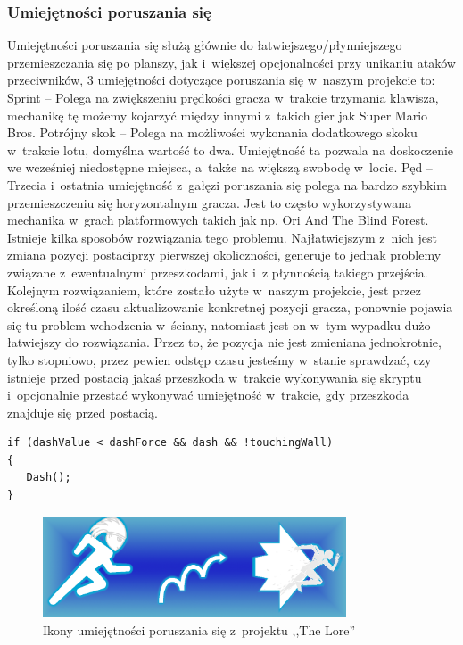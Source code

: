 \documentclass[oneside,polski,logo]{amuthesis}
\begin{document}
\subsubsection{Umiejętności poruszania się}
Umiejętności poruszania się służą głównie do łatwiejszego/płynniejszego przemieszczania się po planszy, jak i~większej opcjonalności przy unikaniu ataków przeciwników, 3 umiejętności dotyczące poruszania się w~naszym projekcie to:
Sprint – Polega na zwiększeniu prędkości gracza w~trakcie trzymania klawisza, mechanikę tę możemy kojarzyć między innymi z~takich gier jak Super Mario Bros.
Potrójny skok – Polega na możliwości wykonania dodatkowego skoku w~trakcie lotu, domyślna wartość to dwa. Umiejętność ta pozwala na doskoczenie we wcześniej niedostępne miejsca, a~także na większą swobodę w~locie.
Pęd – Trzecia i~ostatnia umiejętność z~gałęzi poruszania się polega na bardzo szybkim przemieszczeniu się horyzontalnym gracza. Jest to często wykorzystywana mechanika w~grach platformowych takich jak np. Ori And The Blind Forest. Istnieje kilka sposobów rozwiązania tego problemu. Najłatwiejszym z~nich jest zmiana pozycji postaciprzy pierwszej okoliczności, generuje to jednak problemy związane z~ewentualnymi przeszkodami, jak i~z płynnością takiego przejścia. Kolejnym rozwiązaniem, które zostało użyte w~naszym projekcie, jest przez określoną ilość czasu aktualizowanie konkretnej pozycji gracza, ponownie pojawia się tu problem wchodzenia w~ściany, natomiast jest on w~tym wypadku dużo łatwiejszy do rozwiązania. Przez to, że pozycja nie jest zmieniana jednokrotnie, tylko stopniowo, przez pewien odstęp czasu jesteśmy w~stanie sprawdzać, czy istnieje przed postacią jakaś przeszkoda w~trakcie wykonywania się skryptu i~opcjonalnie przestać wykonywać umiejętność w~trakcie, gdy przeszkoda znajduje się przed postacią.


\begin{lstlisting}[breaklines=true,
language={[Sharp]C},
rulecolor=\color{blue!80!black},
caption={Fragment klasy \texttt{PlayerSkills.cs}}
]    
if (dashValue < dashForce && dash && !touchingWall)
{
   Dash();
}
\end{lstlisting}
\begin{figure}[h]
	\centering
	\includegraphics[width=9cm]{images/kozubal/movement.png}
	\caption{Ikony umiejętności poruszania się z~projektu ,,The Lore''}
\end{figure}
\end{document}
